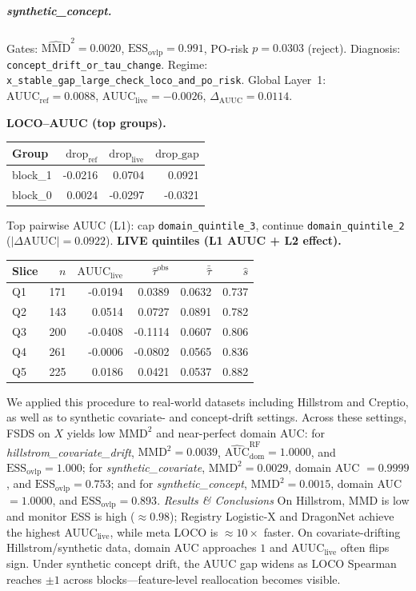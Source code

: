 \documentclass{article}
\begin{document}
\subparagraph{synthetic\_concept.}
Gates: $\widehat{\mathrm{MMD}}^2=0.0020$, $\mathrm{ESS}_{\mathrm{ovlp}}=0.991$, PO-risk $p=0.0303$ (reject). Diagnosis: \texttt{concept\_drift\_or\_tau\_change}. Regime: \texttt{x\_stable\_gap\_large\_check\_loco\_and\_po\_risk}.
Global Layer~1: $\mathrm{AUUC}_{\mathrm{ref}}=0.0088$, $\mathrm{AUUC}_{\mathrm{live}}=-0.0026$, $\Delta_{\mathrm{AUUC}}=0.0114$.

\noindent\textbf{LOCO--AUUC (top groups).}
\begin{center}\small
\begin{tabular}{lrrr}
\toprule Group & $\mathrm{drop}_{\mathrm{ref}}$ & $\mathrm{drop}_{\mathrm{live}}$ & $\mathrm{drop\_gap}$ \\
\midrule
block\_1 & -0.0216 & 0.0704 & 0.0921 \\
block\_0 & 0.0024 & -0.0297 & -0.0321 \\
\bottomrule\end{tabular}\end{center}
\noindent Top pairwise AUUC (L1): cap \texttt{domain\_quintile\_3}, continue \texttt{domain\_quintile\_2} ($|\Delta\mathrm{AUUC}|=0.0922$).
\noindent\textbf{LIVE quintiles (L1 AUUC + L2 effect).}
\begin{center}\small
\begin{tabular}{lrrrrr}
\toprule Slice & $n$ & $\mathrm{AUUC}_{\mathrm{live}}$ & $\widehat{\tau}^{\mathrm{obs}}$ & $\bar{\hat\tau}$ & $\hat s$ \\
\midrule
Q1 & 171 & -0.0194 & 0.0389 & 0.0632 & 0.737 \\
Q2 & 143 & 0.0514 & 0.0727 & 0.0891 & 0.782 \\
Q3 & 200 & -0.0408 & -0.1114 & 0.0607 & 0.806 \\
Q4 & 261 & -0.0006 & -0.0802 & 0.0565 & 0.836 \\
Q5 & 225 & 0.0186 & 0.0421 & 0.0537 & 0.882 \\
\bottomrule\end{tabular}\end{center}


We applied this procedure to real-world datasets including Hillstrom and Creptio, as well as to synthetic covariate- and concept-drift settings. Across these settings, FSDS on \(X\) yields low \(\mathrm{MMD}^2\) and near-perfect domain AUC: for \emph{hillstrom\_covariate\_drift}, \(\mathrm{MMD}^2=0.0039\), \(\widehat{\mathrm{AUC}}_{\mathrm{dom}}^{\mathrm{RF}}=1.0000\), and \(\mathrm{ESS}_{\mathrm{ovlp}}=1.000\); for \emph{synthetic\_covariate}, \(\mathrm{MMD}^2=0.0029\), domain AUC \(=0.9999\), and \(\mathrm{ESS}_{\mathrm{ovlp}}=0.753\); and for \emph{synthetic\_concept}, \(\mathrm{MMD}^2=0.0015\), domain AUC \(=1.0000\), and \(\mathrm{ESS}_{\mathrm{ovlp}}=0.893\).
\emph{Results \& Conclusions} On Hillstrom, MMD is low and monitor ESS is high ($\approx 0.98$);
Registry Logistic-X and DragonNet achieve the highest AUUC$_{\mathrm{live}}$, while meta LOCO is $\approx 10\times$ faster.
On covariate-drifting Hillstrom/synthetic data, domain AUC approaches $1$ and AUUC$_{\mathrm{live}}$ often flips sign.
Under synthetic concept drift, the AUUC gap widens as LOCO Spearman reaches $\pm 1$ across blocks---feature-level reallocation becomes visible.
\end{document}
